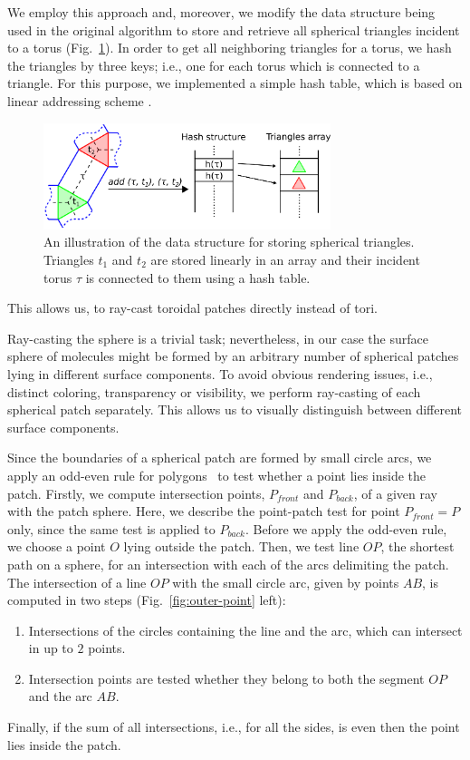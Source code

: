 We employ this approach and, moreover, we modify the data structure being used in the original algorithm to store and retrieve all spherical triangles incident to a torus (Fig.~\ref{fig:hashing}). In order to get all neighboring triangles for a torus, we hash the triangles by three keys; i.e., one for each torus which is connected to a triangle.
For this purpose, we implemented a simple hash table, which is based on linear addressing scheme \cite{alcantara2011efficient}.

\begin{figure}[htb]
  \centering
  \includegraphics[width=3.3in]{image/hashing.png}
  \caption{An illustration of the data structure for storing spherical triangles. Triangles $t_1$ and $t_2$ are stored linearly in an array and their incident torus $\tau$ is connected to them using a hash table.}
	\label{fig:hashing}
\end{figure}
This allows us, to ray-cast toroidal patches directly instead of tori.


Ray-casting the sphere is a trivial task; nevertheless, in our case the surface sphere of molecules might be formed by an arbitrary number of spherical patches lying in different surface components. To avoid obvious rendering issues, i.e., distinct coloring, transparency or visibility, we perform ray-casting of each spherical patch separately.
This allows us to visually distinguish between different surface components.

Since the boundaries of a spherical patch are formed by small circle arcs, we apply an odd-even rule for polygons~\cite{shimrat1962algorithm} to test whether a point lies inside the patch. Firstly, we compute intersection points, $P_{front}$ and $P_{back}$, of a given ray with the patch sphere.
Here, we describe the point-patch test for point $P_{front}=P$ only, since the same test is applied to $P_{back}$.
Before we apply the odd-even rule, we choose a point $O$ lying outside the patch.
Then, we test line $OP$, the shortest path on a sphere, for an intersection with each of the arcs delimiting the patch.
The intersection of a line $OP$ with the small circle arc, given by points $AB$, is computed in two steps (Fig.~\ref{fig:outer-point} left):
\begin{enumerate}
  \item Intersections of the circles containing the line and the arc, which can intersect in up to $2$ points.
  \item Intersection points are tested whether they belong to both the segment $OP$ and the arc $AB$.
\end{enumerate}
Finally, if the sum of all intersections, i.e., for all the sides, is even then the point lies inside the patch.

